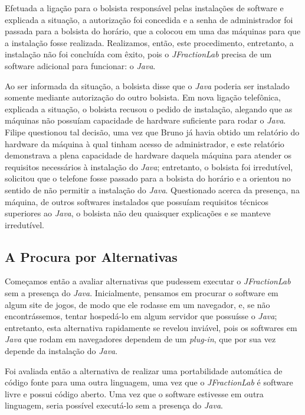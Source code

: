 Efetuada a ligação para o bolsista responsável pelas instalações de software e explicada a situação, a autorização foi concedida e a senha de administrador foi passada para a bolsista do horário, que a colocou em uma das máquinas para que a instalação fosse realizada. Realizamos, então, este procedimento, entretanto, a instalação não foi concluída com êxito, pois o \textit{JFractionLab} precisa de um software adicional para funcionar: o \textit{Java}.

Ao ser informada da situação, a bolsista disse que o \textit{Java} poderia ser instalado somente mediante autorização do outro bolsista. Em nova ligação telefônica, explicada a situação, o bolsista recusou o pedido de instalação, alegando que as máquinas não possuíam capacidade de hardware suficiente para rodar o \textit{Java}. Filipe questionou tal decisão, uma vez que Bruno já havia obtido um relatório do hardware da máquina à qual tinham acesso de administrador, e este relatório demonstrava a plena capacidade de hardware daquela máquina para atender os requisitos necessários à instalação do \textit{Java}; entretanto, o bolsista foi irredutível, solicitou que o telefone fosse passado para a bolsista do horário e a orientou no sentido de não permitir a instalação do \textit{Java}. Questionado acerca da presença, na máquina, de outros softwares instalados que possuíam requisitos técnicos superiores ao \textit{Java}, o bolsista não deu quaisquer explicações e se manteve irredutível.

\subsection{A Procura por Alternativas}\label{sec:LABEL_CHP_REL_SEC_REL_SUBSEC_PROC_ALT}

Começamos então a avaliar alternativas que pudessem executar o \textit{JFractionLab} sem a presença do \textit{Java}. Inicialmente, pensamos em procurar o software em algum site de jogos, de modo que ele rodasse em um navegador, e, se não encontrássemos, tentar hospedá-lo em algum servidor que possuísse o \textit{Java}; entretanto, esta alternativa rapidamente se revelou inviável, pois os softwares em \textit{Java} que rodam em navegadores dependem de um \textit{plug-in}, que por sua vez depende da instalação do \textit{Java}.

Foi avaliada então a alternativa de realizar uma portabilidade automática de código fonte para uma outra linguagem, uma vez que o \textit{JFractionLab} é software livre e possui código aberto. Uma vez que o software estivesse em outra linguagem, seria possível executá-lo sem a presença do \textit{Java}.


